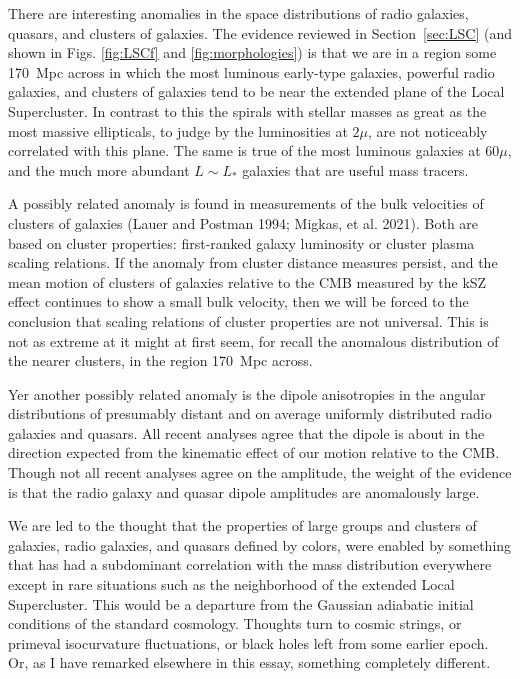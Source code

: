\documentclass[fleqn,12pt]{article}
\begin{document}
There are interesting anomalies in the space distributions of radio galaxies, quasars, and clusters of galaxies. The evidence reviewed in Section~\ref{sec:LSC} (and shown in Figs. \ref{fig:LSCf} and  \ref{fig:morphologies}) is that we are in a region some 170~Mpc across in which the most luminous early-type galaxies, powerful radio galaxies, and clusters of galaxies tend to be near the extended plane of the Local Supercluster. In contrast to this the spirals with stellar masses as great as the most massive ellipticals, to judge by the luminosities at $2\mu$, are not noticeably correlated with this plane. The same is true of the most luminous galaxies at $60\mu$, and the much more abundant $L\sim L_\ast$ galaxies that are useful mass tracers.

A possibly related anomaly is found in measurements of the bulk velocities of clusters of galaxies (Lauer  and Postman 1994; Migkas, et al. 2021). Both are based on cluster properties: first-ranked galaxy luminosity or cluster plasma scaling relations. If the anomaly from cluster distance measures persist, and the mean motion of clusters of galaxies relative to the CMB measured by the kSZ effect continues to show a small bulk velocity, then we will be forced to the conclusion that scaling relations of cluster properties are not universal. This is not as extreme at it might at first seem, for recall the anomalous distribution of the nearer clusters, in the region 170~Mpc across. 

Yer another possibly related anomaly is the dipole anisotropies in the angular distributions of presumably distant and on average uniformly distributed radio galaxies and quasars. All recent analyses agree that the dipole is about in the direction expected from the kinematic effect of our motion relative to the CMB. Though not all recent analyses agree on the amplitude, the weight of the evidence is that the radio galaxy and quasar dipole amplitudes are anomalously large. 

We are led to the thought that the properties of large groups and clusters of galaxies, radio galaxies, and quasars defined by colors, were enabled by something that has had a subdominant correlation with the mass distribution  everywhere except in rare situations such as the neighborhood of the extended Local Supercluster. This would be a departure from the Gaussian adiabatic initial conditions of the standard cosmology. Thoughts turn to cosmic strings, or primeval isocurvature fluctuations, or black holes left from some earlier epoch. Or, as I have remarked elsewhere in this essay, something completely different. 
\end{document}
